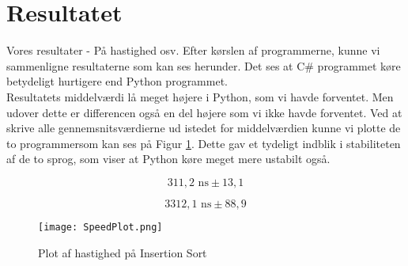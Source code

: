 \documentclass[class=report, crop=false]{standalone}
\begin{document}
    \section{Resultatet}
    Vores resultater -\> På hastighed osv.
    Efter kørslen af programmerne, kunne vi sammenligne resultaterne som kan ses herunder. Det ses at C\# programmet køre betydeligt hurtigere end Python programmet.\\
    Resultatets middelværdi lå meget højere i Python, som vi havde forventet. Men udover dette er differencen også en del højere som vi ikke havde forventet. Ved at skrive alle gennemsnitsværdierne ud istedet for middelværdien kunne vi plotte de to programmersom kan ses på Figur \ref{fig:SpeedPlot}. Dette gav et tydeligt indblik i stabiliteten af de to sprog, som viser at Python køre meget mere ustabilt også. 
    
    \begin{tcolorbox}
         \[ 311,2 \text{ ns} \pm 13,1  \]
    \end{tcolorbox}
    \begin{tcolorbox}
         \[ 3312,1 \text{ ns} \pm 88,9  \]
    \end{tcolorbox}

    \begin{tcolorbox}
        \begin{figure}[H]
            \centering
            \texttt{[image: SpeedPlot.png]}
            \caption{Plot af hastighed på Insertion Sort}
            \label{fig:SpeedPlot}
        \end{figure}
    \end{tcolorbox}
\end{document}
